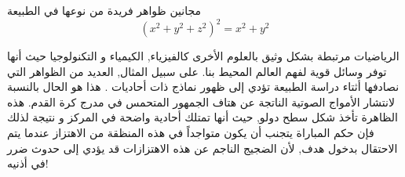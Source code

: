 \begin{surferPage}{مجانين}
ظواهر فريدة من نوعها في الطبيعة\\
\smallskip
\[(x^2+ y^2+ z^2)^2	= x^2+ y^2\]

\singlespacing
الرياضيات مرتبطة بشكل وثيق بالعلوم الأخرى كالفيزياء, الكيمياء و التكنولوجيا حيث أنها توفر وسائل قوية لفهم العالم المحيط بنا.
\singlespacing
   على سبيل المثال, العديد من الظواهر التي نصادفها أثتاء دراسة الطبيعة تؤدي إلى ظهور نماذج ذات أحاديات .
\singlespacing
هذا هو الحال بالنسبة لانتشار الأمواج الصوتية الناتجة عن هتاف الجمهور المتحمس في مدرج كرة القدم. هذه الظاهرة تأخذ شكل سطح دولو, حيث أنها تمتلك أحادية واضحة في المركز و نتيجة لذلك فإن حكم المباراة يتجنب أن يكون متواجداً في هذه المنظقة من الاهتزاز عندما يتم الاحتقال بدخول هدف, لأن الضجيج الناجم عن هذه الاهتزازات قد يؤدي إلى حدوث ضرر في أذنيه!
\end{surferPage}
